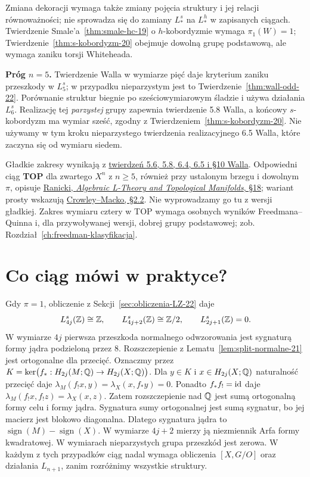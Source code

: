 Zmiana dekoracji wymaga także zmiany
pojęcia struktury i jej relacji równoważności;
nie sprowadza się do zamiany $L_*^s$ na
$L_*^h$ w zapisanych ciągach.
Twierdzenie Smale'a~\ref{thm:smale-hc-19}
o $h$-kobordyzmie wymaga $\pi_1(W)=1$;
Twierdzenie~\ref{thm:s-kobordyzm-20}
obejmuje dowolną grupę podstawową,
ale wymaga zaniku torsji Whiteheada.

\noindent\textbf{Próg $n=5$.}
Twierdzenie Walla w wymiarze pięć daje
kryterium zaniku przeszkody w $L_5^s$;
w przypadku nieparzystym jest to
Twierdzenie~\ref{thm:wall-odd-22}.
Porównanie struktur biegnie po
sześciowymiarowym śladzie i używa
działania $L_6^s$. Realizację tej
\emph{parzystej} grupy zapewnia twierdzenie
5.8 Walla, a końcowy $s$-kobordyzm
ma wymiar sześć, zgodny z
Twierdzeniem~\ref{thm:s-kobordyzm-20}.
Nie używamy w tym kroku nieparzystego
twierdzenia realizacyjnego 6.5 Walla,
które zaczyna się od wymiaru siedem.

Gładkie zakresy wynikają z
\href{https://webhomes.maths.ed.ac.uk/~v1ranick/books/scm.pdf}
{twierdzeń 5.6, 5.8, 6.4, 6.5 i §10 Walla}.
Odpowiedni ciąg \textbf{TOP} dla zwartego
$X^n$ z $n\geq5$, również przy ustalonym
brzegu i dowolnym $\pi$, opisuje
\href{https://webhomes.maths.ed.ac.uk/~v1ranick/homology/topman.pdf}
{Ranicki, \emph{Algebraic L-Theory and Topological
Manifolds}, §18}; wariant prosty wskazują
\href{https://webhomes.maths.ed.ac.uk/~v1ranick/papers/crowmac.pdf}
{Crowley--Macko, §2.2}. Nie wyprowadzamy go tu
z wersji gładkiej. Zakres wymiaru cztery
w TOP wymaga osobnych wyników
Freedmana--Quinna i, dla przywoływanej
wersji, dobrej grupy podstawowej;
zob. Rozdział~\ref{ch:freedman-klasyfikacja}.

\section{Co ciąg mówi w praktyce?}
\label{sec:applications-surgery-23}

\begin{przyklad}
\label{prz:simply-connected-surgery-23}
Gdy $\pi=1$, obliczenie z
Sekcji~\ref{sec:obliczenia-LZ-22} daje
\[
 L_{4j}^s(\mathbb{Z})\cong\mathbb{Z},\qquad
 L_{4j+2}^s(\mathbb{Z})\cong\mathbb{Z}/2,\qquad
 L_{2j+1}^s(\mathbb{Z})=0.
\]
W wymiarze $4j$ pierwsza przeszkoda
normalnego odwzorowania jest sygnaturą
formy jądra podzieloną przez $8$.
Rozszczepienie z
Lematu~\ref{lem:split-normalne-21}
jest ortogonalne dla przecięć. Oznaczmy przez
$K=\ker\bigl(f_*:H_{2j}(M;\mathbb{Q})\to
H_{2j}(X;\mathbb{Q})\bigr)$. Dla $y\in K$
i $x\in H_{2j}(X;\mathbb{Q})$
naturalność przecięć daje
$\lambda_M(f_!x,y)=\lambda_X(x,f_*y)=0$.
Ponadto $f_*f_!=\mathrm{id}$ daje
$\lambda_M(f_!x,f_!z)=\lambda_X(x,z)$.
Zatem rozszczepienie nad $\mathbb{Q}$ jest sumą ortogonalną
formy celu i formy jądra. Sygnatura sumy ortogonalnej
jest sumą sygnatur, bo jej macierz jest blokowo diagonalna.
Dlatego sygnatura jądra to
$\operatorname{sign}(M)-\operatorname{sign}(X)$.
W wymiarze $4j+2$ mierzy ją
niezmiennik Arfa formy kwadratowej.
W wymiarach nieparzystych grupa przeszkód
jest zerowa. W każdym z tych przypadków
ciąg nadal wymaga obliczenia $[X,G/O]$
oraz działania $L_{n+1}$, zanim
rozróżnimy wszystkie struktury.
\end{przyklad}

